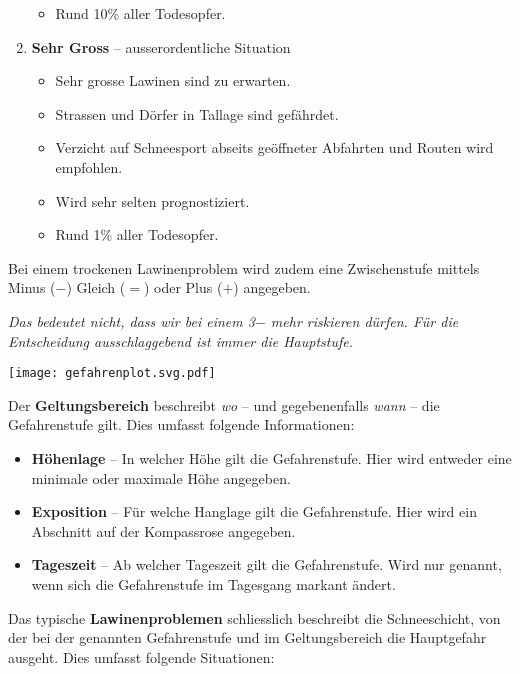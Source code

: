 \begin{enumerate}
{\begin{itemize}
      \item{Rund 10\% aller Todesopfer.}
    \end{itemize}
  }
  \item{
    \textbf{Sehr Gross} -- ausserordentliche Situation
    \begin{itemize}
      \item{Sehr grosse Lawinen sind zu erwarten.}
      \item{Strassen und Dörfer in Tallage sind gefährdet.}
      \item{Verzicht auf Schneesport abseits geöffneter Abfahrten und Routen wird empfohlen.}
      \item{Wird sehr selten prognostiziert.}
      \item{Rund 1\% aller Todesopfer.}
    \end{itemize}
  }
\end{enumerate}

\newcolumn

Bei einem trockenen Lawinenproblem wird zudem eine Zwischenstufe mittels Minus ($-$) Gleich ($=$) oder Plus ($+$) angegeben.

\textit{Das bedeutet nicht, dass wir bei einem 3$-$ mehr riskieren dürfen. Für die Entscheidung ausschlaggebend ist immer die Hauptstufe.}

\begin{center}
  \texttt{[image: gefahrenplot.svg.pdf]}
\end{center}

Der \textbf{Geltungsbereich} beschreibt \textit{wo} -- und gegebenenfalls \textit{wann} -- die Gefahrenstufe gilt.
Dies umfasst folgende Informationen:

\begin{itemize}
  \item{\textbf{Höhenlage} -- In welcher Höhe gilt die Gefahrenstufe. Hier wird entweder eine minimale oder maximale Höhe angegeben.}
  \item{\textbf{Exposition} -- Für welche Hanglage gilt die Gefahrenstufe. Hier wird ein Abschnitt auf der Kompassrose angegeben.}
  \item{\textbf{Tageszeit} -- Ab welcher Tageszeit gilt die Gefahrenstufe. Wird nur genannt, wenn sich die Gefahrenstufe im Tagesgang markant ändert.}
\end{itemize}

Das typische \textbf{Lawinenproblemen} schliesslich beschreibt die Schneeschicht, von der bei der genannten Gefahrenstufe und im Geltungsbereich die Hauptgefahr ausgeht.
Dies umfasst folgende Situationen:

